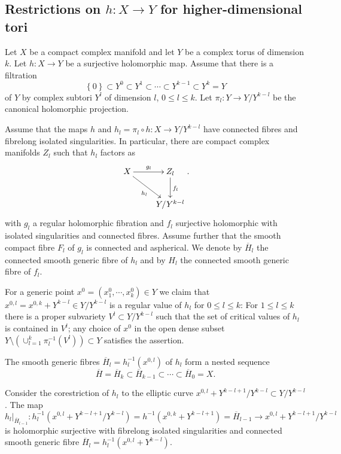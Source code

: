 \subsection{Restrictions on $h:X\rightarrow Y$ for higher-dimensional tori}
\label{sec:Restrictions}

Let $X$ be a compact complex manifold and let $Y$ be a complex torus of dimension $k$. Let $h: X\rightarrow Y$ be a surjective holomorphic map. Assume that there is a filtration
\[
 \left\{0\right\} \subset Y^0\subset Y^1 \subset \cdots \subset Y^{k-1}\subset Y^k=Y
\]
of $Y$ by complex subtori $Y^l$ of dimension $l$, $0\leq l \leq k$. Let $\pi_l: Y\rightarrow Y/Y^{k-l}$ be the canonical holomorphic projection.

Assume that the maps $h$ and $h_l=\pi_l\circ h: X\rightarrow Y/Y^{k-l}$ have connected fibres and fibrelong isolated singularities. In particular, there are compact complex manifolds $Z_l$ such that $h_l$ factors as
\[
 \xymatrix{ X \ar[r]^{g_l}\ar[rd]_{h_l} & Z_l\ar[d]^{f_l} \\ & Y/Y^{k-l}}.
\]
with $g_l$ a regular holomorphic fibration and $f_l$ surjective holomorphic with isolated singularities and connected fibres. Assume further that the smooth compact fibre $F_l$ of $g_l$ is connected and aspherical. We denote by $\overline{H}_l$ the connected smooth generic fibre of $h_l$ and by $H_l$ the connected smooth generic fibre of $f_l$. 

For a generic point $x^0=\left(x_1^0,\cdots, x_k^0\right)\in Y$ we claim that $x^{0,l}=x^{0,k}+Y^{k-l}\in Y/Y^{k-l}$ is a regular value of $h_l$ for $0\leq l \leq k$:  For $1\leq l \leq k$ there is a proper subvariety $V^l \subset Y/Y^{k-l}$ such that the set of critical values of $h_l$ is contained in $V^l$; any choice of $x^0$ in the open dense subset $Y \setminus \left(\cup_{l=1}^k \pi_l^{-1}(V^l)\right) \subset Y$ satisfies the assertion.
 
 The smooth generic fibres $\overline{H}_l=h_l^{-1}(x^{0,l})$ of $h_l$ form a nested sequence
 \[
  \overline{H}= \overline{H}_k\subset \overline{H}_{k-1}\subset \cdots \subset \overline{H}_0=X.
 \]

Consider the corestriction of $h_l$ to the elliptic curve $x^{0,l}+ Y^{k-l+1}/Y^{k-l}\subset Y/Y^{k-l}$. The map 
\[
 h_l|_{\overline{H}_{l-1}}: h_l^{-1}\left(x^{0,l}+ Y^{k-l+1}/Y^{k-l}\right)= h^{-1}\left(x^{0,k}+Y^{k-l+1}\right)=\overline{H}_{l-1}\rightarrow x^{0,l}+Y^{k-l+1}/Y^{k-l}
\]
is holomorphic surjective with fibrelong isolated singularities and connected smooth generic fibre $\overline{H}_l=h_l^{-1}(x^{0,l}+Y^{k-l})$.

